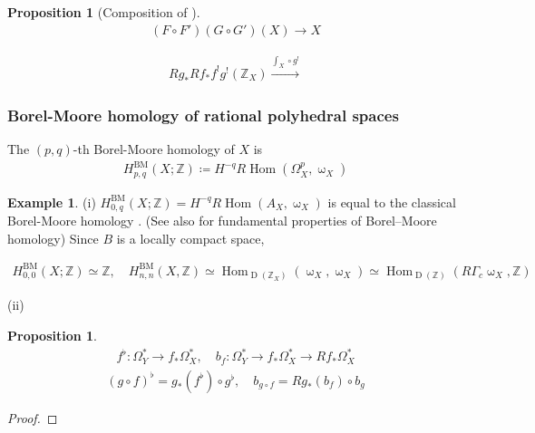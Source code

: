 \documentclass[a4paper,dvipdfmx,reqno,12pt]{amsart}
\theoremstyle{definition}
\newtheorem{Eg}[Thm]{Example}
\newtheorem{Prop}[Thm]{Proposition}
\newcommand{\deq}{\coloneqq}
\newcommand{\Z}{\mathbb{Z}}%
\newcommand{\opn}[1]{\operatorname{#1}}
\newcommand{\xto}[1]{\xrightarrow{#1}}
\numberwithin{equation}{section}
\begin{document}
\begin{Prop}[Composition of ]
  \begin{align}
    (F\circ F')(G\circ G')(X)\to X
  \end{align}

  \begin{align}
    Rg_*Rf_*f^{!}g^{!}(\Z_X)\xto{\int_X\circ g^{!}}
  \end{align}

\end{Prop}

\subsubsection{Borel-Moore homology of rational polyhedral spaces}
The $(p,q)$-th Borel-Moore homology of $X$ is
\begin{align}
  H^{\opn{BM}}_{p,q}(X;\Z)\deq H^{-q}R\opn{Hom}(\Omega_X^{p},\upomega_X)
\end{align}

\begin{Eg} (i) $H_{0,q}^{\opn{BM}}(X;\Z)=H^{-q}R\opn{Hom}(A_X,\upomega_X)$ is equal to the classical Borel-Moore homology
  \cite[Lemma 4.8]{gross2019sheaftheoretic}.
(See also \cite[IX]{iversenCohomologySheaves1986a}
for fundamental properties of Borel--Moore homology)
  Since $B$ is a locally compact space,

  \begin{align}
    H_{0,0}^{\opn{BM}}(X;\Z)\simeq \Z,\quad H^{\opn{BM}}_{n,n}(X,\Z)\simeq \opn{Hom}_{\opn{D}(\Z_X)}(\upomega_X,\upomega_X)\simeq
    \opn{Hom}_{\opn{D}(\Z)}(R\Gamma_c\upomega_X,\Z)
  \end{align}

  (ii)

\end{Eg}



\begin{Prop}

  \begin{align}
    f^{\flat}:\Omega_Y^{*}\to f_*\Omega_X^{*}, \quad b_f: \Omega_Y^{*}\to f_*\Omega_X^{*} \to Rf_*\Omega_X^{*}
  \end{align}
  \begin{align}
    (g\circ f)^{\flat}=g_*(f^{\flat})\circ g^{\flat},
    \quad b_{g\circ f}=Rg_*(b_f)\circ b_g
  \end{align}
\end{Prop}
\begin{proof}

\end{proof}
\end{document}

